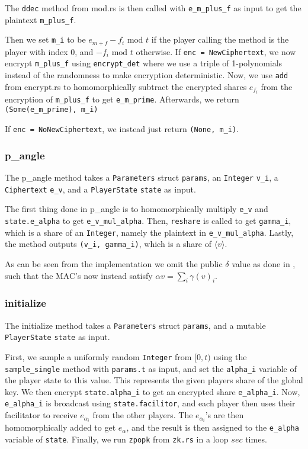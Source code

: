 \documentclass[../main.tex]{subfiles}
\begin{document}
The \lstinline{ddec} method from mod.rs is then called with \lstinline{e_m_plus_f} as input to get the plaintext \lstinline{m_plus_f}.

Then we set \lstinline{m_i} to be $e_{m + f} - f_i \text{ mod } t$ if the player calling the method is the player with index $0$, and $- f_i \text{ mod } t$ otherwise. If \lstinline{enc = NewCiphertext}, we now encrypt \lstinline{m_plus_f} using \lstinline{encrypt_det} where we use a triple of 1-polynomials instead of the randomness to make encryption deterministic. Now, we use \lstinline{add} from encrypt.rs to homomorphically subtract the encrypted shares $e_{f_i}$ from the encryption of \lstinline{m_plus_f} to get \lstinline{e_m_prime}. Afterwards, we return \lstinline{(Some(e_m_prime), m_i)}

If \lstinline{enc = NoNewCiphertext}, we instead just return \lstinline{(None, m_i)}.

\subsubsection{p\_angle}
The p\_angle method takes a \lstinline{Parameters} struct \lstinline{params}, an \lstinline{Integer} \lstinline{v_i}, a \lstinline{Ciphertext} \lstinline{e_v}, and a \lstinline{PlayerState} \lstinline{state} as input.

The first thing done in p\_angle is to homomorphically multiply \lstinline{e_v} and \lstinline{state.e_alpha} to get \lstinline{e_v_mul_alpha}. Then, \lstinline{reshare} is called to get \lstinline{gamma_i}, which is a share of an \lstinline{Integer}, namely the plaintext in \lstinline{e_v_mul_alpha}. Lastly, the method outputs \lstinline{(v_i, gamma_i)}, which is a share of $\langle v \rangle$.

As can be seen from the implementation we omit the public $\delta$ value as done in \cite{damgaard2013practical}, such that the MAC's now instead satisfy $\alpha v = \sum_i \gamma(v)_i$.

\subsubsection{initialize}
The initialize method takes a \lstinline{Parameters} struct \lstinline{params}, and a mutable \lstinline{PlayerState} \lstinline{state} as input.

First, we sample a uniformly random \lstinline{Integer} from $[0, t)$ using the \lstinline{sample_single} method with \lstinline{params.t} as input, and set the \lstinline{alpha_i} variable of the player state to this value. This represents the given players share of the global key. We then encrypt \lstinline{state.alpha_i} to get an encrypted share \lstinline{e_alpha_i}. Now, \lstinline{e_alpha_i} is broadcast using \lstinline{state.facilitor}, and each player then uses their facilitator to receive $e_{\alpha_i}$ from the other players. The $e_{\alpha_i}$'s are then homomorphically added to get $e_\alpha$, and the result is then assigned to the \lstinline{e_alpha} variable of \lstinline{state}. %
Finally, we run \lstinline{zpopk} from \lstinline{zk.rs} in a loop $sec$ times.
\end{document}
